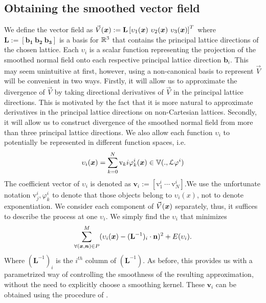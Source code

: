 \subsection{Obtaining the smoothed vector field} \label{sec:getting_vd}
\label{sec:obtainingV}
We define the vector field as $\vec{V}(\vx):=\mathbf{L} \left[\upsilon_1(\vx) \ \upsilon_2(\vx) \ \upsilon_3(\vx)\right]^T$ where $\mathbf{L := [b_1 \ b_2 \ b_3]}$ is a basis for $\realn^3$ that contains the principal lattice directions of the chosen lattice. Each $\upsilon_i$ is a scalar function representing the projection of the smoothed normal field onto each respective principal lattice direction $\mathbf{b}_i$. This may seem unintuitive at first, however, using a non-canonical basis to represent $\vec{V}$ will be convenient in two ways. Firstly, it will allow us to approximate the divergence of $\vec{V}$ by taking directional derivatives of $\vec{V}$ in the principal lattice directions. This is motivated by the fact that it is more natural to approximate derivatives in the principal lattice directions on non-Cartesian lattices. Secondly, it will allow us to construct divergence of the smoothed normal field from more than three principal lattice directions. We also allow each function $\upsilon_i$ to potentially be represented in different function spaces, i.e. {\small 
\begin{equation} 
	\upsilon_i(\vx) = \sum_{k=0}^N \text{v}_ki \varphi_k^i(\vx) \in \aspace{\lattice{L}{\varphi^i}}.
\end{equation}}
The coefficient vector of $\upsilon_i$ is denoted as $\mathbf{v}_i:=\left[\text{v}_1^i \ \cdots \ \text{v}_N^i \right]$.We use the unfortunate notation $\text{v}_j^i, \varphi_k^i$ to denote that those objects belong to $\upsilon_i(x)$, not to denote exponentiation. We consider each component of $\vec{V}(\vx)$ separately, thus, it suffices to describe the process at one $\upsilon_i$. We simply find the $\upsilon_i$ that minimizes {\small 
\begin{equation} \label{eq:vari_eqn}
 	\sump_{\forall (\vx,\vn) \in P }^{M} (\upsilon_i(\vx) - (\mathbf{L}^{-1})_i \cdot \mathbf{n})^2 + E(\upsilon_i).
\end{equation} }
Where $(\mathbf{L}^{-1})_i$ is the $i^{th}$ column of $(\mathbf{L}^{-1}).$ As before, this provides us with a parametrized way of controlling the smoothness of the resulting approximation, without the need to explicitly choose a smoothing kernel. These $\mathbf{v}_i$ can be obtained using the procedure of .


